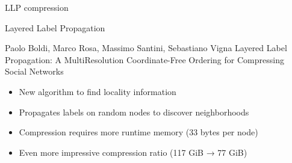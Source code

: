 \documentclass[aspectratio=169,xcolor=table]{beamer}
\begin{document}
    \begin{frame}{LLP compression}
        \begin{block}{Layered Label Propagation}
            \begin{thebibliography}{Foo Bar, 1969}
                \small \vspace{-2mm}
                 Paolo Boldi, Marco Rosa, Massimo Santini, Sebastiano Vigna
                \newblock Layered Label Propagation: A MultiResolution Coordinate-Free Ordering for Compressing Social Networks
            \end{thebibliography}
        \end{block}
        \begin{block}{}
            \begin{itemize}
                \item New algorithm to find locality information
                \item Propagates labels on random nodes to discover neighborhoods
                \item Compression requires more runtime memory (33 bytes per node)
                \item Even more impressive compression ratio (117 GiB → 77 GiB)
            \end{itemize}
        \end{block}
    \end{frame}
\end{document}
